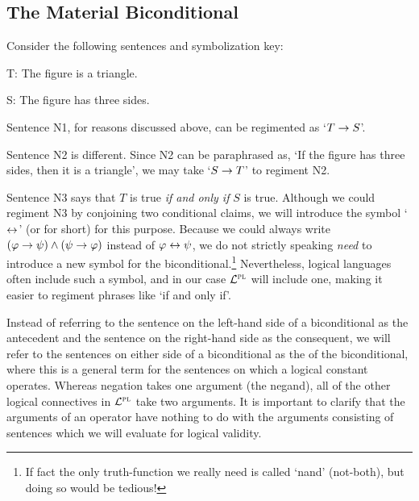 \subsection{The Material Biconditional}
  \label{sec.biconditional}

Consider the following sentences and symbolization key:
\begin{earg}
\end{earg}

\begin{ekey}
\item[T:] The figure is a triangle.
\item[S:] The figure has three sides.
\end{ekey}

Sentence N1, for reasons discussed above, can be regimented as `$T\rightarrow S$'.

Sentence N2 is different.
Since N2 can be paraphrased as, `If the figure has three sides, then it is a triangle', we may take `$S\rightarrow T$' to regiment N2.

Sentence N3 says that $T$ is true \emph{if and only if} $S$ is true.
Although we could regiment N3 by conjoining two conditional claims, we will introduce the  symbol `$\leftrightarrow$' (or  for short) for this purpose.
Because we could always write $(\varphi \rightarrow \psi) \wedge (\psi \rightarrow \varphi)$ instead of $\varphi \leftrightarrow \psi$, we do not strictly speaking \textit{need} to introduce a new symbol for the biconditional.\footnote{If fact the only truth-function we really need is called `nand' (not-both), but doing so would be tedious!} 
Nevertheless, logical languages often include such a symbol, and in our case $\mathcal{L}^{\textsc{pl}}$ will include one, making it easier to regiment phrases like `if and only if'.

Instead of referring to the sentence on the left-hand side of a biconditional as the antecedent and the sentence on the right-hand side as the consequent, we will refer to the sentences on either side of a biconditional as the  of the biconditional, where this is a general term for the sentences on which a logical constant operates.
Whereas negation takes one argument (the negand), all of the other logical connectives in $\mathcal{L}^{\textsc{pl}}$ take two arguments.
It is important to clarify that the arguments of an operator have nothing to do with the arguments consisting of sentences which we will evaluate for logical validity.

